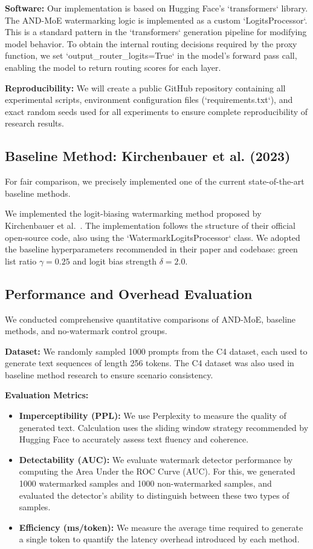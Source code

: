 \documentclass[letterpaper,twocolumn,10pt]{article}
\begin{document}
\textbf{Software:} Our implementation is based on Hugging Face's `transformers` library. The AND-MoE watermarking logic is implemented as a custom `LogitsProcessor`. This is a standard pattern in the `transformers` generation pipeline for modifying model behavior. To obtain the internal routing decisions required by the proxy function, we set `output\_router\_logits=True` in the model's forward pass call, enabling the model to return routing scores for each layer.

\textbf{Reproducibility:} We will create a public GitHub repository containing all experimental scripts, environment configuration files (`requirements.txt`), and exact random seeds used for all experiments to ensure complete reproducibility of research results.

\subsection{Baseline Method: Kirchenbauer et al. (2023)}

For fair comparison, we precisely implemented one of the current state-of-the-art baseline methods.

We implemented the logit-biasing watermarking method proposed by Kirchenbauer et al.~\cite{kirchenbauer2023watermark}. The implementation follows the structure of their official open-source code, also using the `WatermarkLogitsProcessor` class. We adopted the baseline hyperparameters recommended in their paper and codebase: green list ratio $\gamma=0.25$ and logit bias strength $\delta=2.0$.

\subsection{Performance and Overhead Evaluation}

We conducted comprehensive quantitative comparisons of AND-MoE, baseline methods, and no-watermark control groups.

\textbf{Dataset:} We randomly sampled 1000 prompts from the C4 dataset, each used to generate text sequences of length 256 tokens. The C4 dataset was also used in baseline method research to ensure scenario consistency.

\textbf{Evaluation Metrics:}

\begin{itemize}
\item \textbf{Imperceptibility (PPL):} We use Perplexity to measure the quality of generated text. Calculation uses the sliding window strategy recommended by Hugging Face to accurately assess text fluency and coherence.
\item \textbf{Detectability (AUC):} We evaluate watermark detector performance by computing the Area Under the ROC Curve (AUC). For this, we generated 1000 watermarked samples and 1000 non-watermarked samples, and evaluated the detector's ability to distinguish between these two types of samples.
\item \textbf{Efficiency (ms/token):} We measure the average time required to generate a single token to quantify the latency overhead introduced by each method.
\end{itemize}
\end{document}
